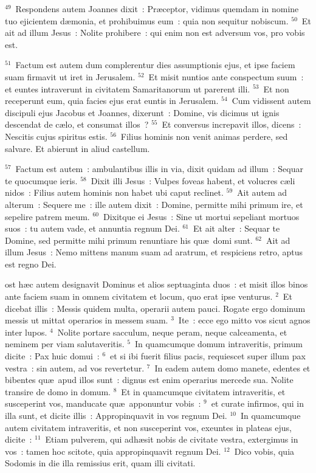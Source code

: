${}^{49}$~Respondens autem Joannes dixit~: Pr\ae ceptor, vidimus quemdam in nomine tuo ejicientem d\ae monia, et prohibuimus eum~: quia non sequitur nobiscum.
${}^{50}$~Et ait ad illum Jesus~: Nolite prohibere~: qui enim non est adversum vos, pro vobis est.


${}^{51}$~Factum est autem dum complerentur dies assumptionis ejus, et ipse faciem suam firmavit ut iret in Jerusalem.
${}^{52}$~Et misit nuntios ante conspectum suum~: et euntes intraverunt in civitatem Samaritanorum ut parerent illi.
${}^{53}$~Et non receperunt eum, quia facies ejus erat euntis in Jerusalem.
${}^{54}$~Cum vidissent autem discipuli ejus Jacobus et Joannes, dixerunt~: Domine, vis dicimus ut ignis descendat de c\ae lo, et consumat illos~?
${}^{55}$~Et conversus increpavit illos, dicens~: Nescitis cujus spiritus estis.
${}^{56}$~Filius hominis non venit animas perdere, sed salvare. Et abierunt in aliud castellum.


${}^{57}$~Factum est autem~: ambulantibus illis in via, dixit quidam ad illum~: Sequar te quocumque ieris.
${}^{58}$~Dixit illi Jesus~: Vulpes foveas habent, et volucres c\ae li nidos~: Filius autem hominis non habet ubi caput reclinet.
${}^{59}$~Ait autem ad alterum~: Sequere me~: ille autem dixit~: Domine, permitte mihi primum ire, et sepelire patrem meum.
${}^{60}$~Dixitque ei Jesus~: Sine ut mortui sepeliant mortuos suos~: tu autem vade, et annuntia regnum Dei.
${}^{61}$~Et ait alter~: Sequar te Domine, sed permitte mihi primum renuntiare his qu\ae\ domi sunt.
${}^{62}$~Ait ad illum Jesus~: Nemo mittens manum suam ad aratrum, et respiciens retro, aptus est regno Dei.

\bchapter
{}ost h\ae c autem designavit Dominus et alios septuaginta duos~: et misit illos binos ante faciem suam in omnem civitatem et locum, quo erat ipse venturus.
${}^{2}$~Et dicebat illis~: Messis quidem multa, operarii autem pauci. Rogate ergo dominum messis ut mittat operarios in messem suam.
${}^{3}$~Ite~: ecce ego mitto vos sicut agnos inter lupos.
${}^{4}$~Nolite portare sacculum, neque peram, neque calceamenta, et neminem per viam salutaveritis.
${}^{5}$~In quamcumque domum intraveritis, primum dicite~: Pax huic domui~:
${}^{6}$~et si ibi fuerit filius pacis, requiescet super illum pax vestra~: sin autem, ad vos revertetur.
${}^{7}$~In eadem autem domo manete, edentes et bibentes qu\ae\ apud illos sunt~: dignus est enim operarius mercede sua. Nolite transire de domo in domum.
${}^{8}$~Et in quamcumque civitatem intraveritis, et susceperint vos, manducate qu\ae\ apponuntur vobis~:
${}^{9}$~et curate infirmos, qui in illa sunt, et dicite illis~: Appropinquavit in vos regnum Dei.
${}^{10}$~In quamcumque autem civitatem intraveritis, et non susceperint vos, exeuntes in plateas ejus, dicite~:
${}^{11}$~Etiam pulverem, qui adh\ae sit nobis de civitate vestra, extergimus in vos~: tamen hoc scitote, quia appropinquavit regnum Dei.
${}^{12}$~Dico vobis, quia Sodomis in die illa remissius erit, quam illi civitati.


